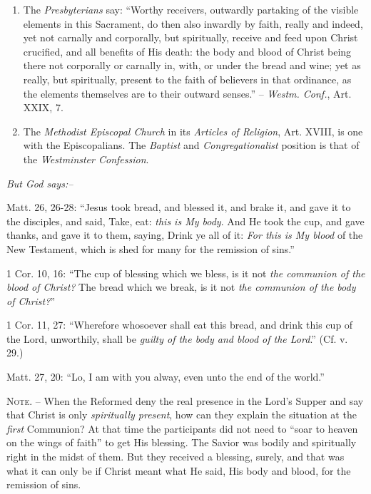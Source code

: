 \documentclass[
]{book}
\begin{document}
\begin{enumerate}
\item
  The \emph{Presbyterians} say: ``Worthy receivers, outwardly partaking of the visible elements in this Sacrament, do then also inwardly by faith, really and indeed, yet not carnally and corporally, but spiritually, receive and feed upon Christ crucified, and all benefits of His death: the body and blood of Christ being there not corporally or carnally in, with, or under the bread and wine; yet as really, but spiritually, present to the faith of believers in that ordinance, as the elements themselves are to their outward senses.'' -- \emph{Westm. Conf.}, Art. XXIX, 7.
\item
  The \emph{Methodist Episcopal Church} in its \emph{Articles of Religion}, Art. XVIII, is one with the Episcopalians. The \emph{Baptist} and \emph{Congregationalist} position is that of the \emph{Westminster Confession}.
\end{enumerate}

\begin{center}
\textsl{But God says:--}
\end{center}

Matt. 26, 26-28: ``Jesus took bread, and blessed it, and brake it, and gave it to the disciples, and said, Take, eat: \emph{this is My body}. And He took the cup, and gave thanks, and gave it to them, saying, Drink ye all of it: \emph{For this is My blood} of the New Testament, which is shed for many for the remission of sins.''

1 Cor. 10, 16: ``The cup of blessing which we bless, is it not \emph{the communion of the blood of Christ?} The bread which we break, is it not \emph{the communion of the body of Christ?}''

1 Cor. 11, 27: ``Wherefore whosoever shall eat this bread, and drink this cup of the Lord, unworthily, shall be \emph{guilty of the body and blood of the Lord}.'' (Cf. v. 29.)

Matt. 27, 20: ``Lo, I am with you alway, even unto the end of the world.''

\textsc{Note. --} When the Reformed deny the real presence in the Lord's Supper and say that Christ is only \emph{spiritually present}, how can they explain the situation at the \emph{first} Communion? At that time the participants did not need to ``soar to heaven on the wings of faith'' to get His blessing. The Savior was bodily and spiritually right in the midst of them. But they received a blessing, surely, and that was what it can only be if Christ meant what He said, His body and blood, for the remission of sins.
\end{document}

